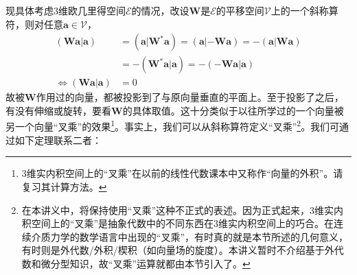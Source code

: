 \documentclass[../main.tex]{subfiles}
\begin{document}
现具体考虑3维欧几里得空间$\mathcal{E}$的情况，改设$\mathbf{W}$是$\mathcal{E}$的平移空间$\mathcal{V}$上的一个斜称算符，则对任意$\mathbf{a}\in\mathcal{V}$，
\[\begin{aligned}\left(\mathbf{Wa}|\mathbf{a}\right)                & =\left(\mathbf{a}|\mathbf{W}^*\mathbf{a}\right)=\left(\mathbf{a}|-\mathbf{Wa}\right)=-\left(\mathbf{a}|\mathbf{Wa}\right) \\
                                                                  & =-\left(\mathbf{W}^*\mathbf{a}|\mathbf{a}\right)=-\left(-\mathbf{Wa}|\mathbf{a}\right)                                    \\
               \Leftrightarrow\left(\mathbf{Wa}|\mathbf{a}\right) & =0
    \end{aligned}\]
故被$\mathbf{W}$作用过的向量，都被投影到了与原向量垂直的平面上。至于投影了之后，有没有伸缩或旋转，要看$\mathbf{W}$的具体取值。这十分类似于以往所学过的一个向量被另一个向量“叉乘”的效果\footnote{3维实内积空间上的“叉乘”在以前的线性代数课本中又称作“向量的外积”\cite[\S3.2]{周胜林2012线性代数}。请复习其计算方法。}。事实上，我们可以从斜称算符定义“叉乘”\footnote{在本讲义中，将保持使用“叉乘”这种不正式的表述。因为正式起来，3维实内积空间上的“叉乘”是抽象代数中的不同东西在3维实内积空间上的巧合。在连续介质力学的数学语言中出现的“叉乘”，有时真的就是本节所述的几何意义，有时则是外代数/外积/楔积（如向量场的旋度）。本讲义暂时不介绍基于外代数和微分型知识，故“叉乘”运算就都由本节引入了。}。我们可通过如下定理联系二者：
\end{document}
